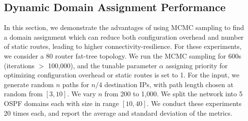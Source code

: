 \begin{figure}
	\centering
\end{figure}
\begin{figure}
	\centering
\end{figure}


\subsection{Dynamic Domain Assignment Performance} \label{sec:mcmceval}
In this section, we demonstrate the advantages of using MCMC sampling
to find a domain assignment which can  
reduce both configuration overhead and number of static routes, 
leading to higher connectivity-resilience. 
For these experiments,
we consider a
80 router fat-tree topology. 
We run the MCMC sampling for 600s
(iterations $>$ 100,000), 
and the tunable parameter $\alpha$ assigning
priority for optimizing configuration 
overhead or static routes is set
to 1. For the input, we generate 
random $n$ paths for $n/4$
destination IPs, with path
 length chosen at random from $[3,10]$. 
We vary $n$ from 200 to 1,000.
We
split the network into 5 OSPF domains 
each with size in range $[10,40]$. We
conduct these experiments 20 times each, 
and report the average and
standard deviation of the metrics.

